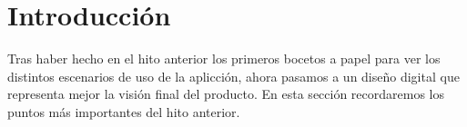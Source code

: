 \section{Introducción}

Tras haber hecho en el hito anterior los primeros bocetos a papel para ver los distintos escenarios de uso de la aplicción, ahora pasamos a un diseño digital que representa mejor la visión final del producto. En esta sección recordaremos los puntos más importantes del hito anterior.